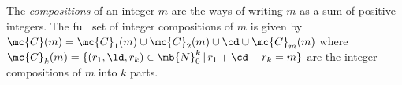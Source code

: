 \begin{prop}
\label{prop:wavefunction-infinite-recursion}
\end{prop}

\begin{dfn}\label{dfn:integer-compositions}
The \textit{compositions} of an integer $m$ are the ways of writing $m$ as a sum of positive integers.
The full set of integer compositions of $m$ is given by
$
  \mc{C}(m)
=
  \mc{C}_1(m)
  \cup
  \mc{C}_2(m)
  \cup
  \cd
  \cup
  \mc{C}_m(m)
$
where
$
  \mc{C}_k(m)
=
  \{
    (r_1,\ld,r_k)\in\mb{N}_0^k
  \,|\,
    r_1+\cd+r_k
  =
    m
  \}
$
are the integer compositions of $m$ into $k$ parts.
\end{dfn}

